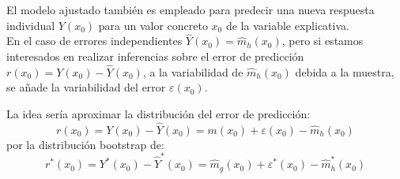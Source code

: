 \documentclass[
]{book}
\theoremstyle{break}
\theoremstyle{definition}
\theoremstyle{definition}
\theoremstyle{definition}
\theoremstyle{remark}
\begin{document}
El modelo ajustado también es empleado para predecir una nueva respuesta individual \(Y(x_0)\) para un valor concreto \(x_0\) de la variable explicativa.\\
En el caso de errores independientes \(\hat{Y}(x_0) = \hat{m}_h(x_0)\), pero si estamos interesados en realizar inferencias sobre el error de predicción \(r(x_0) = Y(x_0) - \hat{Y}(x_0)\), a la variabilidad de \(\hat{m}_h(x_0)\) debida a la muestra, se añade la variabilidad del error \(\varepsilon(x_0)\).

La idea sería aproximar la distribución del error de predicción:
\[r(x_0) = Y(x_0) - \hat{Y}(x_0) = m(x_0) + \varepsilon(x_0) - \hat{m}_h(x_0)\]
por la distribución bootstrap de:
\[r^{\ast}(x_0) = Y^{\ast}(x_0) - \hat{Y}^{\ast}(x_0) = \hat{m}_g(x_0) + \varepsilon^{\ast}(x_0) - \hat{m}^{\ast}_h(x_0)\]
\end{document}
